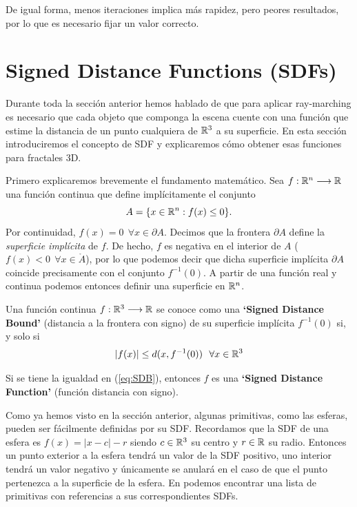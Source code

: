 De igual forma, menos iteraciones implica más rapidez, pero peores resultados, por lo que es necesario fijar un valor correcto.

\section{Signed Distance Functions (SDFs)}
\label{section:SDFs}

Durante toda la sección anterior hemos hablado de que para aplicar ray-marching es necesario que cada objeto que componga la escena cuente con una función que estime la distancia de un punto cualquiera de $\mathbb{R}^3$ a su superficie. En esta sección introduciremos el concepto de SDF y explicaremos cómo obtener esas funciones para fractales 3D.

Primero explicaremos brevemente el fundamento matemático. Sea $f:\mathbb{R}^n\longrightarrow\mathbb{R}$ una función continua que define implícitamente el conjunto 
$$
A = \{x\in\mathbb{R}^n: f(x)\leq 0\}.
$$
Por continuidad, $f(x)=0\ \ \forall x\in\partial A$. Decimos que la frontera $\partial A$ define la \textit{superficie implícita} de $f$. De hecho, $f$ es negativa en el interior de $A$ ($f(x)<0 \ \ \forall x\in\mathring A$), por lo que podemos decir que dicha superficie implícita $\partial A$ coincide precisamente con el conjunto $f^{-1}(0)$. A partir de una función real y continua podemos entonces definir una superficie en $\mathbb{R}^n$.

\begin{definicion}[SDF]
    Una función continua $f:\mathbb{R}^3\longrightarrow\mathbb{R}$ se conoce como una \textbf{`Signed Distance Bound'} (distancia a la frontera con signo) de su superficie implícita $f^{-1}(0)$ si, y solo si
    \begin{equation}
        \label{eq:SDB}
        |f(x)|\leq d(x,f^{-1}(0)) \ \ \forall x\in\mathbb{R}^3
    \end{equation}
    
    Si se tiene la igualdad en (\ref{eq:SDB}), entonces $f$ es una \textbf{`Signed Distance Function'} (función distancia con signo).
\end{definicion}

Como ya hemos visto en la sección anterior, algunas primitivas, como las esferas, pueden ser fácilmente definidas por su SDF. Recordamos que la SDF de una esfera es $f(x)=|x-c|-r$ siendo $c\in\mathbb{R}^3$ su centro y $r\in\mathbb{R}$ su radio. Entonces un punto exterior a la esfera tendrá un valor de la SDF positivo, uno interior tendrá un valor negativo y únicamente se anulará en el caso de que el punto pertenezca a la superficie de la esfera. En \cite[Table 1]{Hart-1995} podemos encontrar una lista de primitivas con referencias a sus correspondientes SDFs.